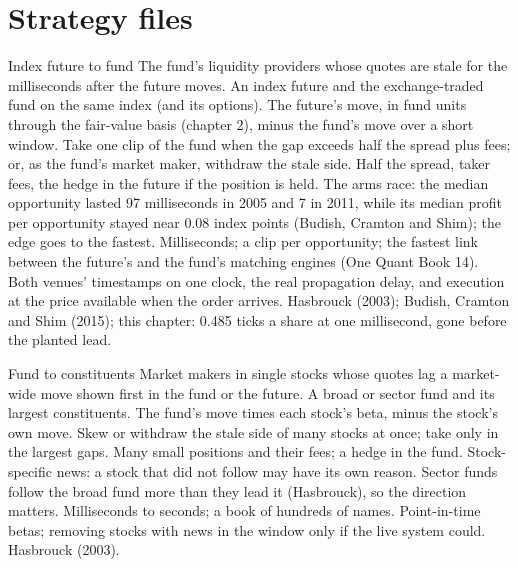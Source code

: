 \section{Strategy files}

\begin{strategyfile}{Index future to fund}\label{strat:hf:lead-lag-and-cross-venue-trading:future}
 The fund's liquidity providers whose quotes are stale for the milliseconds after the future moves.
 An index future and the exchange-traded fund on the same index (and its options).
 The future's move, in fund units through the fair-value basis (chapter 2), minus the fund's move over a short window.
 Take one clip of the fund when the gap exceeds half the spread plus fees; or, as the fund's market maker, withdraw the
stale side.
 Half the spread, taker fees, the hedge in the future if the position is held.
 The arms race: the median opportunity lasted 97 milliseconds in 2005 and 7 in 2011, while its median profit per opportunity
stayed near 0.08 index points (Budish, Cramton and Shim); the edge goes to the fastest.
 Milliseconds; a clip per opportunity; the fastest link between the future's and the fund's matching
engines (One Quant Book 14).
 Both venues' timestamps on one clock, the real propagation delay, and execution at the price available when the order
arrives.
 Hasbrouck (2003); Budish, Cramton and Shim (2015); this chapter: 0.485 ticks a share at one millisecond, gone before the planted lead.
\end{strategyfile}

\begin{strategyfile}{Fund to constituents}\label{strat:hf:lead-lag-and-cross-venue-trading:etf}
 Market makers in single stocks whose quotes lag a market-wide move shown first in the fund or the future.
 A broad or sector fund and its largest constituents.
 The fund's move times each stock's beta, minus the stock's own move.
 Skew or withdraw the stale side of many stocks at once; take only in the largest gaps.
 Many small positions and their fees; a hedge in the fund.
 Stock-specific news: a stock that did not follow may have its own reason. Sector funds follow the broad fund more than they lead
it (Hasbrouck), so the direction matters.
 Milliseconds to seconds; a book of hundreds of names.
 Point-in-time betas; removing stocks with news in the window only if the live system could.
 Hasbrouck (2003).
\end{strategyfile}


